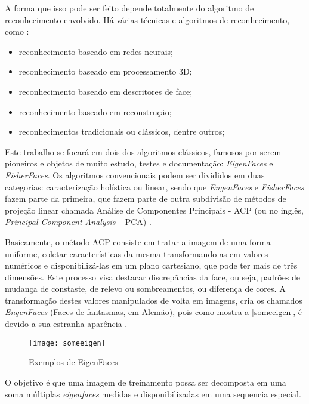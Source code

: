 A forma que isso pode ser feito depende totalmente do algoritmo de reconhecimento envolvido. Há várias técnicas e algoritmos de reconhecimento, como \cite{issues_methods_FR}:

\begin{itemize}
	\item reconhecimento baseado em redes neurais;
	\item reconhecimento baseado em processamento 3D;
	\item reconhecimento baseado em descritores de face;
	\item reconhecimento baseado em reconstrução;
	\item reconhecimentos tradicionais ou clássicos, dentre outros;
\end{itemize}

Este trabalho se focará em dois dos algoritmos clássicos, famosos por serem pioneiros e objetos de muito estudo, testes e documentação: \textit{EigenFaces} e \textit{FisherFaces}. Os algoritmos convencionais podem ser divididos em duas categorias: caracterização holística ou linear, sendo que \textit{EngenFaces} e \textit{FisherFaces} fazem parte da primeira, que fazem parte de outra subdivisão de métodos de projeção linear chamada Análise de Componentes Principais - ACP (ou no inglês, \textit{Principal Component Analysis} – PCA) \cite{issues_methods_FR}.

Basicamente, o método ACP consiste em tratar a imagem de uma forma uniforme, coletar características da mesma transformando-as em valores numéricos e disponibilizá-las em um plano cartesiano, que pode ter mais de três dimensões. Este processo visa destacar discrepâncias da face, ou seja, padrões de mudança de constaste, de relevo ou sombreamentos, ou diferença de cores. A transformação destes valores manipulados de volta em imagens, cria os chamados \textit{EngenFaces} (Faces de fantasmas, em Alemão), pois como mostra a \autoref{someeigen}, é devido a sua estranha aparência \cite{drmathew_java_programming}.

\begin{figure}[h]
	\centering
	\texttt{[image: someeigen]}
	\caption{Exemplos de EigenFaces}
	\label{someeigen}
\end{figure}

O objetivo é que uma imagem de treinamento possa ser decomposta em uma soma múltiplas \textit{eigenfaces} medidas e disponibilizadas em uma sequencia especial.

